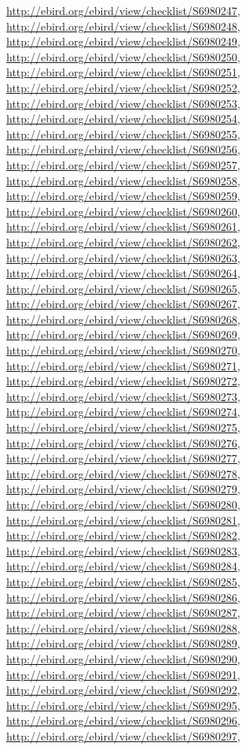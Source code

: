 \documentclass[9pt, article]{memoir}
\begin{document}
\begin{multicols}{2}
\url{http://ebird.org/ebird/view/checklist/S6980247}, 
\url{http://ebird.org/ebird/view/checklist/S6980248}, 
\url{http://ebird.org/ebird/view/checklist/S6980249}, 
\url{http://ebird.org/ebird/view/checklist/S6980250}, 
\url{http://ebird.org/ebird/view/checklist/S6980251}, 
\url{http://ebird.org/ebird/view/checklist/S6980252}, 
\url{http://ebird.org/ebird/view/checklist/S6980253}, 
\url{http://ebird.org/ebird/view/checklist/S6980254}, 
\url{http://ebird.org/ebird/view/checklist/S6980255}, 
\url{http://ebird.org/ebird/view/checklist/S6980256}, 
\url{http://ebird.org/ebird/view/checklist/S6980257}, 
\url{http://ebird.org/ebird/view/checklist/S6980258}, 
\url{http://ebird.org/ebird/view/checklist/S6980259}, 
\url{http://ebird.org/ebird/view/checklist/S6980260}, 
\url{http://ebird.org/ebird/view/checklist/S6980261}, 
\url{http://ebird.org/ebird/view/checklist/S6980262}, 
\url{http://ebird.org/ebird/view/checklist/S6980263}, 
\url{http://ebird.org/ebird/view/checklist/S6980264}, 
\url{http://ebird.org/ebird/view/checklist/S6980265}, 
\url{http://ebird.org/ebird/view/checklist/S6980267}, 
\url{http://ebird.org/ebird/view/checklist/S6980268}, 
\url{http://ebird.org/ebird/view/checklist/S6980269}, 
\url{http://ebird.org/ebird/view/checklist/S6980270}, 
\url{http://ebird.org/ebird/view/checklist/S6980271}, 
\url{http://ebird.org/ebird/view/checklist/S6980272}, 
\url{http://ebird.org/ebird/view/checklist/S6980273}, 
\url{http://ebird.org/ebird/view/checklist/S6980274}, 
\url{http://ebird.org/ebird/view/checklist/S6980275}, 
\url{http://ebird.org/ebird/view/checklist/S6980276}, 
\url{http://ebird.org/ebird/view/checklist/S6980277}, 
\url{http://ebird.org/ebird/view/checklist/S6980278}, 
\url{http://ebird.org/ebird/view/checklist/S6980279}, 
\url{http://ebird.org/ebird/view/checklist/S6980280}, 
\url{http://ebird.org/ebird/view/checklist/S6980281}, 
\url{http://ebird.org/ebird/view/checklist/S6980282}, 
\url{http://ebird.org/ebird/view/checklist/S6980283}, 
\url{http://ebird.org/ebird/view/checklist/S6980284}, 
\url{http://ebird.org/ebird/view/checklist/S6980285}, 
\url{http://ebird.org/ebird/view/checklist/S6980286}, 
\url{http://ebird.org/ebird/view/checklist/S6980287}, 
\url{http://ebird.org/ebird/view/checklist/S6980288}, 
\url{http://ebird.org/ebird/view/checklist/S6980289}, 
\url{http://ebird.org/ebird/view/checklist/S6980290}, 
\url{http://ebird.org/ebird/view/checklist/S6980291}, 
\url{http://ebird.org/ebird/view/checklist/S6980292}, 
\url{http://ebird.org/ebird/view/checklist/S6980295}, 
\url{http://ebird.org/ebird/view/checklist/S6980296}, 
\url{http://ebird.org/ebird/view/checklist/S6980297}, 

\end{multicols}
\end{document}
